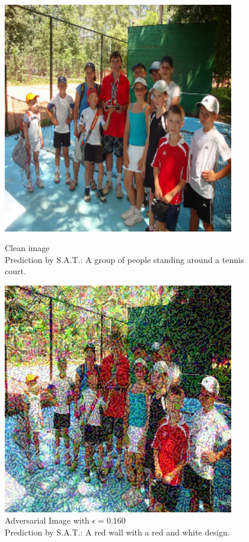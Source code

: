 \begin{figure}[ht]
    \centering
    \begin{minipage}{0.45\textwidth}
        \centering
        \includegraphics[width=0.9\textwidth]{figures/group_of_people/group_of_people_0.000.png} %
        \caption*{Clean image\\Prediction by S.A.T.: A group of people standing around a tennis court.}
    \end{minipage}\hfill
    \begin{minipage}{0.45\textwidth}
        \centering
        \includegraphics[width=0.9\textwidth]{figures/group_of_people/group_of_people_0.160.png} %
        \caption*{Adversarial Image with $\epsilon=0.160$\\Prediction by S.A.T.: A red wall with a red and white design.}
    \end{minipage}
\end{figure}

